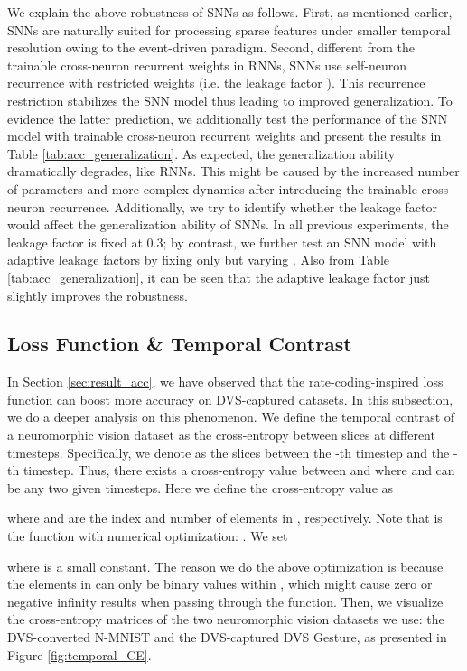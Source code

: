 \documentclass[journal,10pt,twocolumn]{IEEETran}
\begin{document}
We explain the above robustness of SNNs as follows. First, as mentioned earlier, SNNs are naturally suited for processing sparse features under smaller temporal resolution owing to the event-driven paradigm. Second, different from the trainable cross-neuron recurrent weights in RNNs, SNNs use self-neuron recurrence with restricted weights (i.e. the leakage factor ). This recurrence restriction stabilizes the SNN model thus leading to improved generalization. To evidence the latter prediction, we additionally test the performance of the SNN model with trainable cross-neuron recurrent weights and present the results in Table \ref{tab:acc_generalization}. As expected, the generalization ability dramatically degrades, like RNNs. This might be caused by the increased number of parameters and more complex dynamics after introducing the trainable cross-neuron recurrence. Additionally, we try to identify whether the leakage factor would affect the generalization ability of SNNs. In all previous experiments, the leakage factor is fixed at 0.3; by contrast, we further test an SNN model with adaptive leakage factors by fixing only  but varying . Also from Table \ref{tab:acc_generalization}, it can be seen that the adaptive leakage factor just slightly improves the robustness.


\subsection{Loss Function \& Temporal Contrast}

In Section \ref{sec:result_acc}, we have observed that the rate-coding-inspired loss function can boost more accuracy on DVS-captured datasets. In this subsection, we do a deeper analysis on this phenomenon. We define the temporal contrast of a neuromorphic vision dataset as the cross-entropy between slices at different timesteps. Specifically, we denote  as the slices between the -th timestep  and the -th timestep. Thus, there exists a cross-entropy value between  and  where  and  can be any two given timesteps. Here we define the cross-entropy value as

where  and  are the index and number of elements in , respectively. Note that  is the  function with numerical optimization: . We set

where  is a small constant. The reason we do the above optimization is because the elements in  can only be binary values within , which might cause zero or negative infinity results when passing through the  function. Then, we visualize the cross-entropy matrices of the two neuromorphic vision datasets we use: the DVS-converted N-MNIST and the DVS-captured DVS Gesture, as presented in Figure \ref{fig:temporal_CE}.
\end{document}
